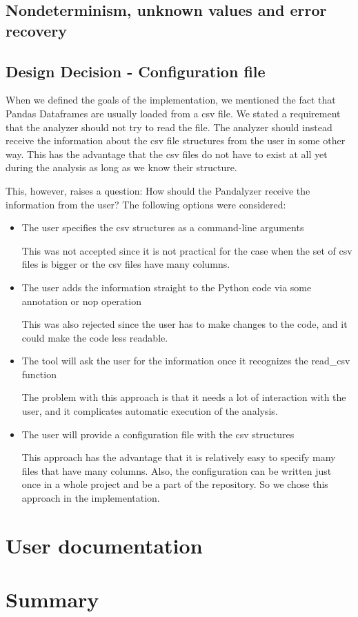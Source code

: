 \subsection{Nondeterminism, unknown values and error recovery}



\subsection{Design Decision - Configuration file}

When we defined the goals of the implementation, we mentioned the fact that Pandas Dataframes are usually loaded
from a csv file.
We stated a requirement that the analyzer should not try to read the file.
The analyzer should instead receive the information about the csv file structures from the user in some other way.
This has the advantage that the csv files do not have to exist at all yet during the analysis as long as we know their
structure.

This, however, raises a question: How should the Pandalyzer receive the information from the user?
The following options were considered:
\begin{itemize}
    \item The user specifies the csv structures as a command-line arguments

    This was not accepted since it is not practical for the case when the set of csv files is bigger or the csv files
    have many columns.

    \item The user adds the information straight to the Python code via some annotation or nop operation

    This was also rejected since the user has to make changes to the code, and it could make the code less readable.

    \item The tool will ask the user for the information once it recognizes the read\_csv function

    The problem with this approach is that it needs a lot of interaction with the user, and it complicates automatic
    execution of the analysis.

    \item The user will provide a configuration file with the csv structures

    This approach has the advantage that it is relatively easy to specify many files that have many columns.
    Also, the configuration can be written just once in a whole project and be a part of the repository.
    So we chose this approach in the implementation.
\end{itemize}


\section{User documentation}

\section*{Summary}
